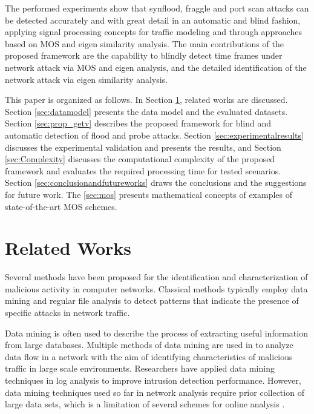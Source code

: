 \documentclass[review]{elsarticle}
\begin{document}
The performed experiments show that synflood, fraggle and port scan attacks can be detected accurately and with great detail in an automatic and blind fashion, applying signal processing concepts for traffic modeling and through approaches based on MOS and eigen similarity analysis. The main contributions of the proposed framework are the capability to blindly detect time frames under network attack via MOS and eigen analysis, and the detailed identification of the network attack via eigen similarity analysis.

This paper is organized as follows. In Section \ref{sec:relatedworks}, related works are discussed. Section \ref{sec:datamodel} presents the data model and the evaluated datasets. Section \ref{sec:prop_getv} describes the proposed framework for blind and automatic detection of flood and probe attacks. Section \ref{sec:experimentalresults} discusses the experimental validation and presents the results, and Section \ref{sec:Complexity} discusses the computational complexity of the proposed framework and evaluates the required processing time for tested scenarios. Section \ref{sec:conclusionandfutureworks} draws the conclusions and the suggestions for future work. The \ref{sec:mos} presents mathematical concepts of examples of state-of-the-art MOS schemes.


\section{Related Works}
\label{sec:relatedworks}

Several methods have been proposed for the identification and characterization of malicious activity in computer networks. Classical methods typically employ data mining \cite{he2008applying,ghourabi2010data,osanaiye2016distributed} and regular file analysis \cite{raynal2004honeypot} to detect patterns that indicate the presence of specific attacks in network traffic.

Data mining is often used to describe the process of extracting useful information from large databases. Multiple methods of data mining are used in \cite{he2008applying,osanaiye2016distributed} to analyze data flow in a network with the aim of identifying characteristics of malicious traffic in large scale environments. Researchers have applied data mining techniques in log analysis \cite{ghourabi2010data} to improve intrusion detection performance. However, data mining techniques used so far in network analysis require prior collection of large data sets, which is a limitation of several schemes for online analysis \cite{Huang2009}.
\end{document}
